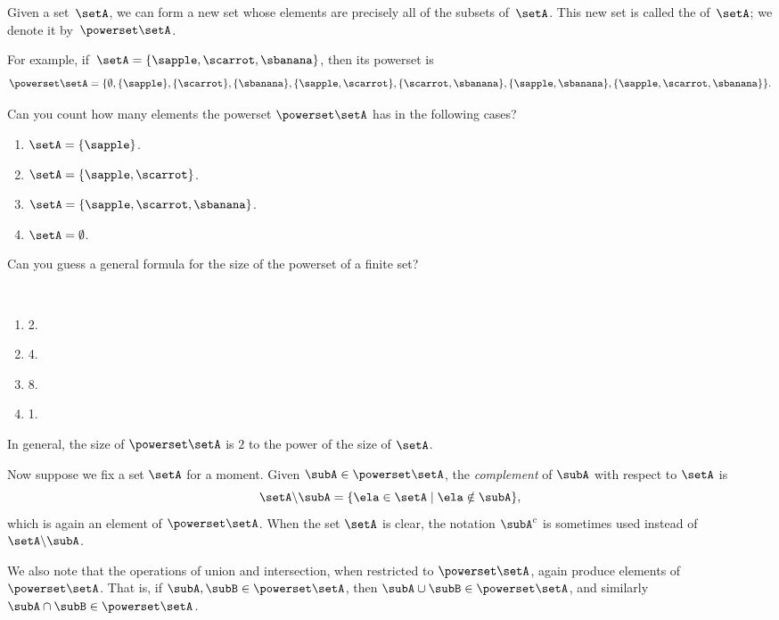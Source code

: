 Given a set~$\setA$, we can form a new set whose elements are precisely all of the subsets of~$\setA$.
This new set is called the  of~$\setA$; we denote it by~$\powerset \setA$.


For example, if~$\setA = \{ \sapple, \scarrot, \sbanana \}$, then its powerset is
\begin{equation*}
    \powerset \setA = \{ \emptyset, \{ \sapple \}, \{ \scarrot \}, \{ \sbanana\}, \{ \sapple, \scarrot \}, \{ \scarrot, \sbanana \}, \{ \sapple, \sbanana\}, \{ \sapple, \scarrot, \sbanana \} \}.
\end{equation*}

\begin{exercise}
Can you count how many elements the powerset $\powerset \setA$ has in the following cases? 
\begin{enumerate}
\item $\setA = \{ \sapple \} $. 
\item $\setA = \{ \sapple, \scarrot \} $.
\item $\setA = \{ \sapple, \scarrot, \sbanana \} $. 
\item $\setA = \emptyset $. 
\end{enumerate}
Can you guess a general formula for the size of the powerset of a finite set? 
\end{exercise}

\begin{solution}
\

\begin{enumerate}
\item 2. 
\item 4. 
\item 8.
\item 1. 
\end{enumerate}
In general, the size of $\powerset \setA$ is $2$ to the power of the size of $\setA$. 
\end{solution}

Now suppose we fix a set $\setA$ for a moment. Given $\subA \in \powerset \setA$, the \emph{complement} of $\subA$ with respect to $\setA$ is
\begin{equation}
\setA \backslash \subA = \{ \ela \in \setA \mid \ela \notin \subA \},
\end{equation}
which is again an element of $\powerset \setA$. 
When the set $\setA$ is clear, the notation $\subA^c$ is sometimes used instead of $\setA \backslash \subA$. 

We also note that the operations of union and intersection, when restricted to $\powerset \setA$, again produce elements of $\powerset \setA$. That is, if $\subA, \subB \in \powerset \setA$, then $\subA \cup \subB \in \powerset \setA$, and similarly $\subA \cap \subB \in \powerset \setA$. 

